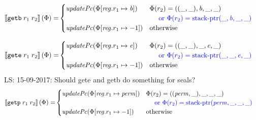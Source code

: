\documentclass[a4paper]{article}
\newcommand\lau[1]{{\color{purple} \sf \footnotesize {LS: #1}}\\}
\newcommand{\sem}[1]{\left\llbracket #1 \right\rrbracket}
\newcommand{\tor}{\text{ or }}
\newcommand{\totherwise}{\text{otherwise }}
\newcommand{\sourcecolor}[1]{\color{blue}}
\newcommand{\src}[1]{{\sourcecolor{} #1}}
\newcommand{\targetcolor}[1]{\color{black}}
\newcommand{\trg}[1]{{\targetcolor{} #1}}
\newcommand{\zinstr}[1]{\texttt{#1}}
\newcommand{\twoinstr}[3]{
  \ifthenelse{\equal{#2#3}{}}
  {\zinstr{#1}}
  {\zinstr{#1} \; #2 \; #3}
}
\newcommand{\tgetb}[2]{\twoinstr{\trg{getb}}{#1}{#2}}
\newcommand{\tgete}[2]{\twoinstr{\trg{gete}}{#1}{#2}}
\newcommand{\tgetp}[2]{\twoinstr{\trg{getp}}{#1}{#2}}
\newcommand{\update}[2]{[#1 \mapsto #2]}
\newcommand{\updReg}[2]{\update{\reg.#1}{#2}}
\newcommand{\perm}{\var{perm}}
\newcommand{\stkptr}[1]{\mathrm{stack\text{-}ptr}(#1)}
\newcommand{\var}[1]{\mathit{#1}}
\newcommand{\reg}{\var{reg}}
\newcommand{\baddr}{\var{b}}
\newcommand{\eaddr}{\var{e}}
\newcommand{\plainfun}[2]{
  \ifthenelse{\equal{#2}{}}
  {\mathit{#1}}
  {\mathit{#1}(#2)}
}
\newcommand{\updPcAddr}[1]{\plainfun{updatePc}{#1}}
\begin{document}
\begin{align*}
  \sem{\tgetb{r_1}{r_2}}(\Phi) = & 
                                   \begin{cases}
                                     \updPcAddr{\Phi\updReg{r_1}{\baddr}} & 
                                     \arraycolsep=0pt
                                     \begin{array}[t]{l}
                                       \Phi(r_2) = ((\_,\_),\baddr,\_,\_) \\
                                       \quad \src{\tor \Phi(r_2) = \stkptr{\_,\baddr,\_,\_} } \\
                                     \end{array} \\
                                     \updPcAddr{\Phi\updReg{r_1}{-1}} & \totherwise
                                   \end{cases}
\end{align*}

\begin{align*}
  \sem{\tgete{r_1}{r_2}}(\Phi) = & 
                                   \begin{cases}
                                     \updPcAddr{\Phi\updReg{r_1}{\eaddr}} & 
                                     \arraycolsep=0pt
                                     \begin{array}[t]{l}
                                       \Phi(r_2) = ((\_,\_),\_,\eaddr,\_) \\
                                       \quad \src{\tor \Phi(r_2) = \stkptr{\_,\_,\eaddr,\_} } \\
                                     \end{array} \\
                                     \updPcAddr{\Phi\updReg{r_1}{-1}} & \totherwise
                                   \end{cases}
\end{align*}
\lau{15-09-2017: Should gete and getb do something for seals?}

\begin{align*}
  \sem{\tgetp{r_1}{r_2}}(\Phi) = & 
                                   \begin{cases}
                                     \updPcAddr{\Phi\updReg{r_1}{\perm}} & 
                                     \arraycolsep=0pt
                                     \begin{array}[t]{l}
                                       \Phi(r_2) = ((\perm,\_),\_,\_,\_) \\
                                       \quad \src{\tor \Phi(r_2) = \stkptr{\perm,\_,\_,\_} } \\
                                     \end{array} \\
                                     \updPcAddr{\Phi\updReg{r_1}{-1}} & \totherwise
                                   \end{cases}
\end{align*}
\end{document}
